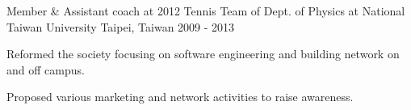 \begin{cventries}

\cventry
{Member \& Assistant coach at 2012} %
{Tennis Team of Dept. of Physics at National Taiwan University} %
{Taipei, Taiwan} %
{2009 - 2013} %
{ %
\begin{cvitems}
\item {Reformed the society focusing on software engineering and building network on and off campus.}
\item {Proposed various marketing and network activities to raise awareness.}
\end{cvitems}
}


\end{cventries}